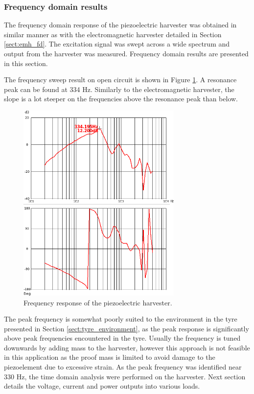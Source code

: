 \subsubsection{Frequency domain results} \label{sect:piezo_fd}
The frequency domain response of the piezoelectric harvester was obtained in similar manner as with the electromagnetic harvester detailed in Section \ref{sect:emh_fd}. The excitation signal was swept across a wide spectrum and output from the harvester was measured. Frequency domain results are presented in this section.

The frequency sweep result on open circuit is shown in Figure \ref{fig:piezo_fd}. A resonance peak can be found at 334 Hz. Similarly to the electromagnetic harvester, the slope is a lot steeper on the frequencies above the resonance peak than below. 

\begin{figure}[htb]
\begin{center}
\includegraphics[height=10cm]{images/own_measurement/generator_shaker/piezo_fd_open_2_3.png}
\end{center}
\caption{\label{fig:piezo_fd} Frequency response of the piezoelectric harvester.}
\end{figure}


The peak frequency is somewhat poorly suited to the environment in the tyre presented in Section \ref{sect:tyre_environment}, as the peak response is significantly above peak frequencies encountered in the tyre. Usually the frequency is tuned downwards by adding mass to the harvester, however this approach is not feasible in this application as the proof mass is limited to avoid damage to the piezoelement due to excessive strain. As the peak frequency was identified near 330 Hz, the time domain analysis were performed on the harvester. Next section details the voltage, current and power outputs into various loads.

